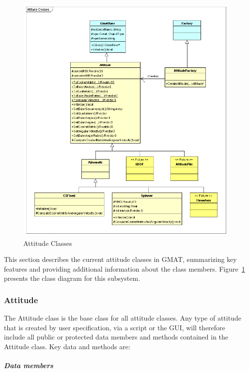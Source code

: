 \begin{figure}
\begin{center}
\includegraphics[430,485]{Images/AttitudeClasses.png}
\caption{\label{figure:AttitudeClasses}Attitude Classes}
\end{center}
\end{figure}

This section describes the current attitude classes in GMAT, summarizing key features and providing additional information about the class members.  Figure~\ref{figure:AttitudeClasses} presents the class diagram for this subsystem.

\subsubsection{Attitude}

The Attitude class is the base class for all attitude classes.  Any type of attitude that is created by user specification, via a script or the GUI, will therefore include all public or protected data members and methods contained in the Attitude class.  Key data and methods are:

\subparagraph{\textit{Data members}}


